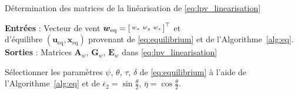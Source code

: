 \begin{algorithm}
     \caption{Détermination des matrices de la linéarisation de \eqref{eq:lpv_linearisation}}\label{alg:linea}
      \hspace*{.1cm} \textbf{Entrées} : Vecteur de vent $\boldsymbol{w}_{\text{eq}} =\left[ \begin{smallmatrix}w_x & w_y & w_z \end{smallmatrix} \right]^\top$ et\\
      \hspace*{1.2cm} d'équilibre $(\boldsymbol{u}_{\text{eq}}, \boldsymbol{x}_{\text{eq}})$ provenant de \eqref{eq:equilibrium} et de l'Algorithme~\ref{alg:eq}.\\
 \hspace*{.1cm} \textbf{Sorties} : 
 Matrices $\boldsymbol{A}_{w}$, $\boldsymbol{G}_{w}$, $\boldsymbol{E}_{w}$ dans \eqref{eq:lpv_linearisation}

\begin{algorithmic}[1]

\State Sélectionner les paramètres $\psi$, $\theta$, $\tau$, $\delta$ de \eqref{eq:equilibrium} à l'aide de l'Algorithme~\ref{alg:eq} et de $\overline \epsilon_{2} = \sin{\frac{\theta}{2}}$, $\overline \eta =  \cos{\frac{\theta}{2}}$.


\end{algorithmic}
\end{algorithm}
